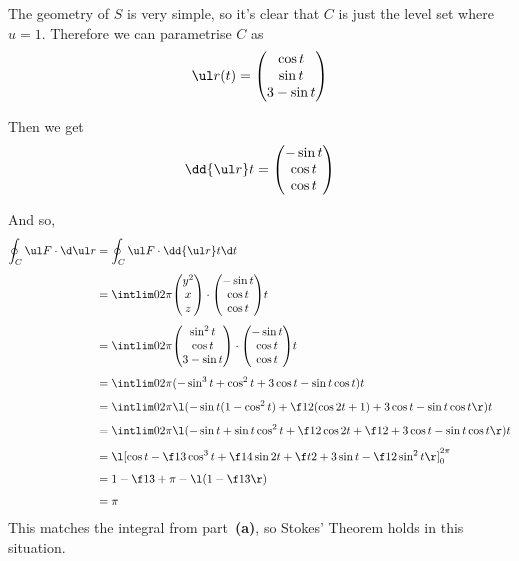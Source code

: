 \documentclass[a4paper]{article}
\begin{document}
The geometry of $S$ is very simple, so it's clear that $C$ is just the level set where $u=1$. Therefore we can parametrise $C$ as $$\ul r(t) = \begin{pmatrix} \cos t \\ \sin t \\ 3 - \sin t \end{pmatrix}$$

Then we get $$\dd {\ul r}t = \begin{pmatrix} -\sin t \\ \cos t \\ \cos t \end{pmatrix}$$

And so, \begin{align*}
\oint_C \ul F \cdot \d \ul r &= \oint_C \ul F \cdot \dd {\ul r}t \d t\\[1ex]
&= \intlim 0{2\pi} {\begin{pmatrix} y^2 \\ x \\ z \end{pmatrix} \cdot \begin{pmatrix} -\sin t \\ \cos t \\ \cos t \end{pmatrix}} t\\[1ex]
&= \intlim 0{2\pi} {\begin{pmatrix} \sin^2 t \\ \cos t \\ 3 - \sin t \end{pmatrix} \cdot \begin{pmatrix} -\sin t \\ \cos t \\ \cos t \end{pmatrix}} t\\[1ex]
&= \intlim 0{2\pi} {(-\sin^3 t + \cos^2 t + 3 \cos t - \sin t \cos t)} t\\[1ex]
&= \intlim 0{2\pi} {\l( -\sin t (1 - \cos^2 t) + \f12 (\cos 2 t + 1) + 3 \cos t - \sin t \cos t \r)} t\\[1ex]
&= \intlim 0{2\pi} {\l( -\sin t + \sin t \cos^2 t + \f12 \cos 2 t + \f12 + 3 \cos t - \sin t \cos t \r)} t\\[1ex]
&= \l[ \cos t - \f13 \cos^3 t + \f14 \sin 2t + \f t2 + 3 \sin t - \f12 \sin^2 t \r]_0^{2\pi}\\[1ex]
&= 1 - \f13 + \pi - \l( 1 - \f13 \r)\\[1ex]
&= \pi
\end{align*}
This matches the integral from part~\textbf{(a)}, so Stokes' Theorem holds in this situation.
\end{document}
